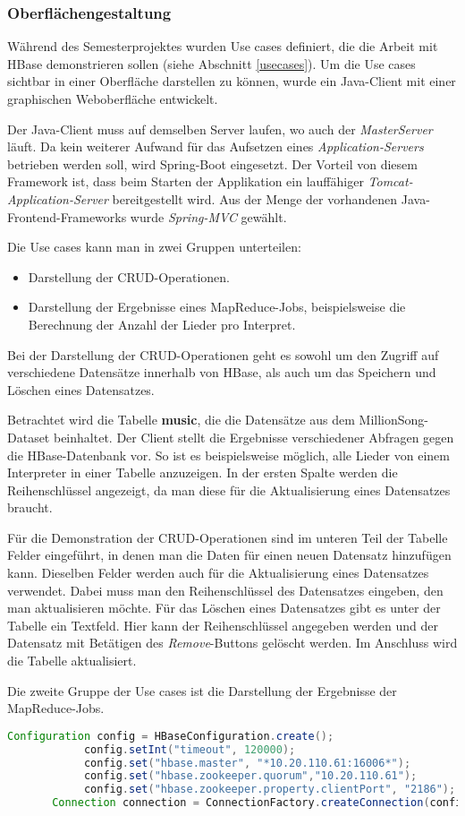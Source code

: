 \subsubsection{Oberflächengestaltung}

Während des Semesterprojektes wurden Use cases definiert, die die Arbeit mit  HBase demonstrieren sollen (siehe Abschnitt \ref{usecases}).
Um die Use cases sichtbar in einer Oberfläche darstellen zu können, wurde ein Java-Client mit einer graphischen Weboberfläche entwickelt.

Der Java-Client muss auf demselben Server laufen, wo auch der \textit{MasterServer} läuft. Da kein weiterer Aufwand für das Aufsetzen eines \textit{Application-Servers} betrieben werden soll, wird Spring-Boot eingesetzt. Der Vorteil von diesem Framework ist, dass beim Starten der Applikation ein lauffähiger \textit{Tomcat-Application-Server} bereitgestellt wird. 
Aus der Menge der vorhandenen Java-Frontend-Frameworks wurde \textit{Spring-MVC} gewählt.  

Die Use cases kann man in zwei Gruppen unterteilen:
\begin{itemize}
\item Darstellung der \ac{CRUD}-Operationen.
\item Darstellung der Ergebnisse eines MapReduce-Jobs, beispielsweise die Berechnung der Anzahl der Lieder pro Interpret.
\end{itemize}
Bei der Darstellung der \ac{CRUD}-Operationen geht es sowohl um den Zugriff auf verschiedene Datensätze innerhalb von HBase, als auch um das Speichern und Löschen eines Datensatzes.

Betrachtet wird die Tabelle \textbf{music}, die die Datensätze aus dem MillionSong-Dataset beinhaltet.
Der Client stellt die Ergebnisse verschiedener Abfragen gegen die HBase-Datenbank vor. So ist es beispielsweise möglich, alle Lieder von einem Interpreter in einer Tabelle anzuzeigen. In der ersten Spalte werden die Reihenschlüssel angezeigt, da man diese für die Aktualisierung eines Datensatzes braucht.

Für die Demonstration der \ac{CRUD}-Operationen sind im unteren Teil der Tabelle Felder eingeführt, in denen man die Daten für einen neuen Datensatz hinzufügen kann. Dieselben Felder werden auch für die Aktualisierung eines Datensatzes verwendet. Dabei muss man den Reihenschlüssel des Datensatzes eingeben, den man aktualisieren möchte.
Für das Löschen eines Datensatzes gibt es unter der Tabelle ein Textfeld. Hier kann der Reihenschlüssel angegeben werden und der Datensatz mit Betätigen des \textit{Remove}-Buttons gelöscht werden. Im Anschluss wird die Tabelle aktualisiert.

Die zweite Gruppe der Use cases ist die Darstellung der Ergebnisse der MapReduce-Jobs.
\begin{lstlisting}[language=Java]
Configuration config = HBaseConfiguration.create();
            config.setInt("timeout", 120000);
            config.set("hbase.master", "*10.20.110.61:16006*");
            config.set("hbase.zookeeper.quorum","10.20.110.61");
            config.set("hbase.zookeeper.property.clientPort", "2186");
	   Connection connection = ConnectionFactory.createConnection(config);
\end{lstlisting}